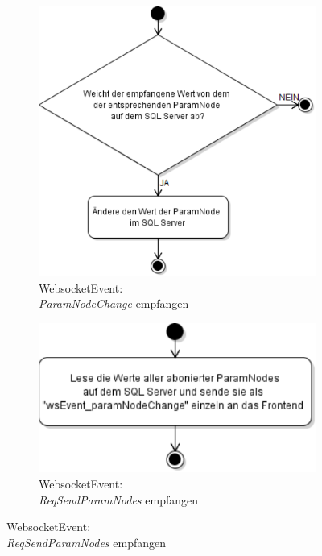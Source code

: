   
\begin{figure}[ht]
  \centering
   \begin{subfigure}[b]{0.543125\textwidth}
    \centering
    \includegraphics[width=\textwidth]{content/hauptteil/systemEntwurf/res/wsHandler/backend/wsEvent_paramNodeChange.pdf}
    \caption{WebsocketEvent:\\\emph{ParamNodeChange} empfangen}
    \label{fig:aDDB:wsEvent_paramNodeChange}
  \end{subfigure}
  \hfill
  \begin{subfigure}[b]{0.446875\textwidth}
    \centering
    \includegraphics[width=\textwidth]{content/hauptteil/systemEntwurf/res/wsHandler/backend/wsEvent_reqSendParamNodes.pdf}
    \caption{WebsocketEvent:\\\emph{ReqSendParamNodes} empfangen}
    \label{fig:aDDB:wsEvent_reqSendParamNodes}
  \end{subfigure}
  \hspace{50mm}


\end{figure}
